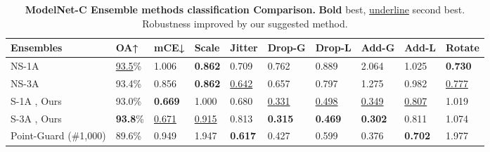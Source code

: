 \documentclass[10pt,twocolumn]{article}
\begin{document}
\begin{table*}
  \centering
\begin{tabular}{p{4.0cm} || p{0.85cm} p{0.95cm} p{0.75cm} p{0.8cm} p{1.1cm} p{1.1cm} p{1.0cm} p{1.0cm} p{0.75cm}}
    \hline
    Ensembles & OA↑ & mCE↓ & Scale & Jitter & Drop-G & Drop-L & Add-G & Add-L & Rotate \\
    \hline
    NS-1A \cite{dgcnn} & \underline{93.5}\% & 1.006 & \textbf{0.862} &  0.709 & 0.762 & 0.889 & 2.064 & 1.025 & \textbf{0.730}\\
NS-3A \cite{dgcnn, pct, gdanet} & 93.4\% & 0.856 & \textbf{0.862} &  \underline{0.642} & 0.657 & 0.797 & 1.275 & 0.982 & \underline{0.777}\\
    \hline
    S-1A \cite{dgcnn}, Ours & 93.0\% & \textbf{0.669} & 1.000 &  0.680 & \underline{0.331} & \underline{0.498} & \underline{0.349} & \underline{0.807} & 1.019\\
    S-3A \cite{dgcnn, pct, gdanet}, Ours & \textbf{93.8}\% & \underline{0.671} &\underline{0.915} &  0.813 & \textbf{0.315} & \textbf{0.469} & \textbf{0.302} & 0.811 & 1.074\\
\hline
    Point-Guard (\#1,000) \cite{pointguard} & 89.6\% & 0.949 & 1.947 &  \textbf{0.617} & 0.427 &  0.599 & 0.376 & \textbf{0.702} &  1.977\\
    \hline
  \end{tabular}
  \caption{{\bf ModelNet-C Ensemble methods classification Comparison.} {\bf Bold} best, \underline{underline} second best. Robustness improved by our suggested method.}
  \label{table:comparison_ensemble}
\end{table*}
\end{document}
